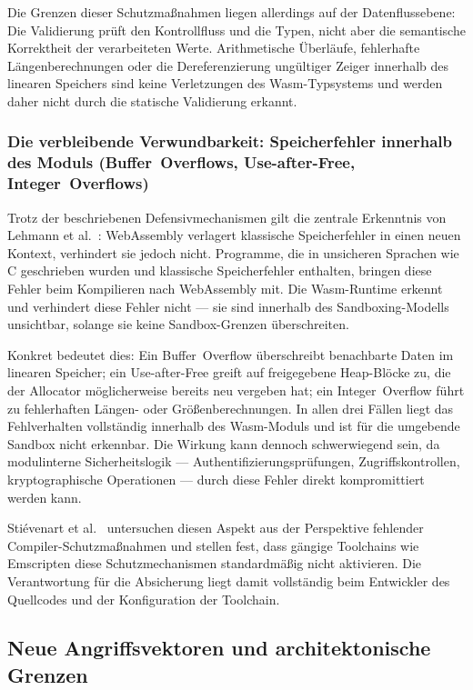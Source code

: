 Die Grenzen dieser Schutzmaßnahmen liegen allerdings auf der Datenflussebene: Die Validierung prüft den Kontrollfluss und die Typen, nicht aber die semantische Korrektheit der verarbeiteten Werte. Arithmetische Überläufe, fehlerhafte Längenberechnungen oder die Dereferenzierung ungültiger Zeiger innerhalb des linearen Speichers sind keine Verletzungen des Wasm-Typsystems und werden daher nicht durch die statische Validierung erkannt.

\subsubsection{Die verbleibende Verwundbarkeit: Speicherfehler innerhalb des Moduls (Buffer~Overflows, Use-after-Free, Integer~Overflows)}

Trotz der beschriebenen Defensivmechanismen gilt die zentrale Erkenntnis von Lehmann et al.~\cite{255318}: WebAssembly verlagert klassische Speicherfehler in einen neuen Kontext, verhindert sie jedoch nicht. Programme, die in unsicheren Sprachen wie C geschrieben wurden und klassische Speicherfehler enthalten, bringen diese Fehler beim Kompilieren nach WebAssembly mit. Die Wasm-Runtime erkennt und verhindert diese Fehler nicht --- sie sind innerhalb des Sandboxing-Modells unsichtbar, solange sie keine Sandbox-Grenzen überschreiten.

Konkret bedeutet dies: Ein Buffer~Overflow überschreibt benachbarte Daten im linearen Speicher; ein Use-after-Free greift auf freigegebene Heap-Blöcke zu, die der Allocator möglicherweise bereits neu vergeben hat; ein Integer~Overflow führt zu fehlerhaften Längen- oder Größenberechnungen. In allen drei Fällen liegt das Fehlverhalten vollständig innerhalb des Wasm-Moduls und ist für die umgebende Sandbox nicht erkennbar. Die Wirkung kann dennoch schwerwiegend sein, da modulinterne Sicherheitslogik --- Authentifizierungsprüfungen, Zugriffskontrollen, kryptographische Operationen --- durch diese Fehler direkt kompromittiert werden kann.

Stiévenart et al.~\cite{stiévenart2021securityrisklackingcompiler} untersuchen diesen Aspekt aus der Perspektive fehlender Compiler-Schutzmaßnahmen und stellen fest, dass gängige Toolchains wie Emscripten diese Schutzmechanismen standardmäßig nicht aktivieren. Die Verantwortung für die Absicherung liegt damit vollständig beim Entwickler des Quellcodes und der Konfiguration der Toolchain.

\subsection{Neue Angriffsvektoren und architektonische Grenzen}

